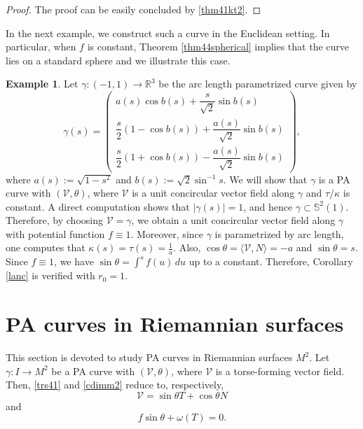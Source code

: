 \documentclass[12pt]{amsart}
\def\r{\mathbb R}
\def\s{\mathbb S}
\def\v{\mathcal V}
\theoremstyle{definition}
\newtheorem{example}[theorem]{Example}
\begin{document}
\begin{proof}
The proof can be easily concluded by \eqref{thm41kt2}.
\end{proof}

In the next example, we construct such a curve in the Euclidean setting. In particular, when $f$ is constant, Theorem \ref{thm44spherical} implies that the curve lies on a standard sphere and we illustrate this case.

\begin{example}
Let $\gamma:(-1,1)\to \r^3$ be the arc length parametrized curve given by
$$
\gamma(s)=
\begin{pmatrix}
 a(s)\cos b(s)+\dfrac{s}{\sqrt{2}}\sin b(s)\\[8pt]
\dfrac{s}{2}(1-\cos b(s))+\dfrac{a(s)}{\sqrt{2}}\sin b(s) \\[8pt]
\dfrac{s}{2}(1+\cos b(s))-\dfrac{a(s)}{\sqrt{2}}\sin b(s)
\end{pmatrix},
$$
where $a(s):=\sqrt{1-s^2}$ and $b(s):=\sqrt{2}\sin^{-1}s.$ We will show that $\gamma$ is a PA curve with $(\v,\theta)$, where $\v$ is a unit concircular vector field along $\gamma$ and $\tau/\kappa$ is constant. A direct computation shows that $|\gamma(s)|=1$, and hence $\gamma\subset \s^2(1)$. Therefore, by choosing $\v=\gamma$, we obtain a unit concircular vector field along $\gamma$ with potential function $f\equiv 1$. Moreover, since $\gamma$ is parametrized by arc length, one computes that $\kappa(s)=\tau(s)=\frac{1}{a}.$ Also, $\cos\theta=\langle \v,N\rangle=-a$ and $\sin\theta=s.$ Since $f\equiv 1$, we have $\sin\theta=\int^s f(u)\,du$
up to a constant. Therefore, Corollary \ref{lanc} is verified with $r_0=1$.
\end{example}








\section{PA curves in Riemannian surfaces} \label{secdim2}

This section is devoted to study PA curves in Riemannian surfaces $M^2$. Let $\gamma:I\to M^2$ be a PA curve  with $(\v,\theta)$, where $\v$ is a torse-forming vector field. Then, \eqref{trs41} and \eqref{cdimm2} reduce to, respectively,
\begin{equation}
\v=\sin\theta T+\cos \theta N  \label{trs300}
\end{equation}
and
\begin{equation}
f\sin\theta+\omega(T)=0.  \label{trs301}
\end{equation}
\end{document}
